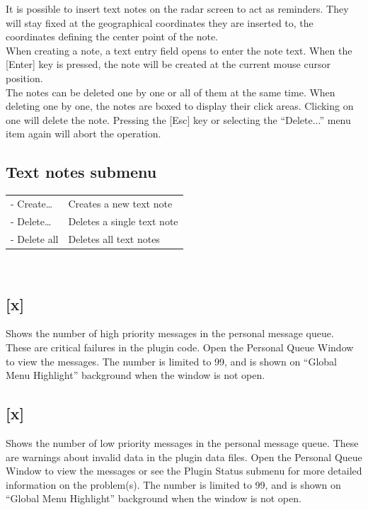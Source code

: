 \documentclass[11pt,a4paper,oldfontcommands]{memoir}
\begin{document}
It is possible to insert text notes on the radar screen to act as reminders. They will stay fixed at the
geographical coordinates they are inserted to, the coordinates defining the center point of the note.
\\When creating a note, a text entry field opens to enter the note text. When the [Enter] key is pressed, the
note will be created at the current mouse cursor position.
\\The notes can be deleted one by one or all of them at the same time. When deleting one by one, the notes
are boxed to display their click areas. Clicking on one will delete the note. Pressing the [Esc] key or selecting
the “Delete...” menu item again will abort the operation.

\subsection*{Text notes submenu}
\begin{tabular}{p{5cm}p{10cm}}
\\- Create…     & Creates a new text note
\\- Delete…     & Deletes a single text note
\\- Delete all  & Deletes all text notes
\end{tabular}\\

\subsection{[x]}
Shows the number of high priority messages in the personal message queue. These are critical failures in
the plugin code. Open the Personal Queue Window to view the messages. The number is limited to 99, and
is shown on “Global Menu Highlight” background when the window is not open.

\subsection{[x]}
Shows the number of low priority messages in the personal message queue. These are warnings about
invalid data in the plugin data files. Open the Personal Queue Window to view the messages or see the
Plugin Status submenu for more detailed information on the problem(s). The number is limited to 99, and is
shown on “Global Menu Highlight” background when the window is not open.
\end{document}
